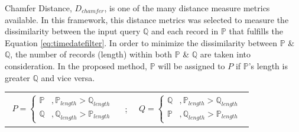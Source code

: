 Chamfer Distance, $D_{chamfer}$, is one of the many distance measure metrics available. In this framework, this distance metrics was selected to measure the dissimilarity between the input query $\mathbb{Q}$ and each record in $\mathbb{P}$ that fulfills the Equation \ref{eq:timedatefilter}. In order to minimize the dissimilarity between $\mathbb{P}$ \& $\mathbb{Q}$, the number of records (length) within both $\mathbb{P}$ \& $\mathbb{Q}$ are taken into consideration. In the proposed method, $\mathbb{P}$ will be assigned to $P$ if $\mathbb{P}$'s length is greater $\mathbb{Q}$ and vice versa.


\begin{table}[b!]
\centering
\begin{tabular}{ccc}
    \begin{equation*}
        \begin{aligned}
            P =\begin{cases}
                \mathbb{P} & ,\mathbb{P}_{length} > \mathbb{Q}_{length} \\
                \mathbb{Q} & ,\mathbb{Q}_{length} > \mathbb{P}_{length}
            \end{cases}
        \end{aligned}
    \end{equation*} 
    & ; &
    \begin{equation*}
        \begin{aligned}
            Q =\begin{cases}
                \mathbb{Q} & ,\mathbb{P}_{length} > \mathbb{Q}_{length} \\
                \mathbb{P} & ,\mathbb{Q}_{length} > \mathbb{P}_{length}
            \end{cases}
        \end{aligned}
    \end{equation*} 
\end{tabular}
\end{table}





